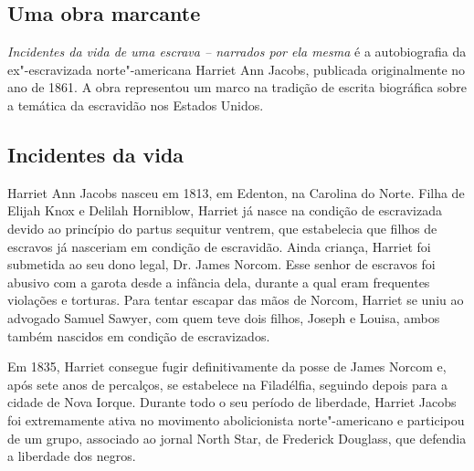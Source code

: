 \documentclass[11pt]{extarticle}
\begin{document}
\subsection{Uma obra marcante}

\emph{Incidentes da vida de uma escrava -- narrados por ela mesma} é a
autobiografia da ex"-escravizada norte"-americana Harriet Ann Jacobs,
publicada originalmente no ano de 1861. A obra representou um marco na
tradição de escrita biográfica sobre a temática da escravidão nos
Estados Unidos.




\subsection{Incidentes da vida}

Harriet Ann Jacobs nasceu em 1813, em Edenton, na Carolina do
Norte. Filha de Elijah Knox e Delilah Horniblow, Harriet já nasce na
condição de escravizada devido ao princípio do partus sequitur ventrem,
que estabelecia que filhos de escravos já nasceriam em condição de
escravidão. Ainda criança, Harriet foi submetida ao seu dono legal, Dr.
James Norcom. Esse senhor de escravos foi abusivo com a garota desde a
infância dela, durante a qual eram frequentes violações e torturas. Para
tentar escapar das mãos de Norcom, Harriet se uniu ao advogado Samuel
Sawyer, com quem teve dois filhos, Joseph e Louisa, ambos também
nascidos em condição de escravizados.





Em 1835, Harriet consegue fugir definitivamente da posse de James Norcom
e, após sete anos de percalços, se estabelece na Filadélfia, seguindo
depois para a cidade de Nova Iorque. Durante todo o seu período de
liberdade, Harriet Jacobs foi extremamente ativa no movimento
abolicionista norte"-americano e participou de um grupo, associado ao
jornal North Star, de Frederick Douglass, que defendia a liberdade dos
negros.


\end{document}
